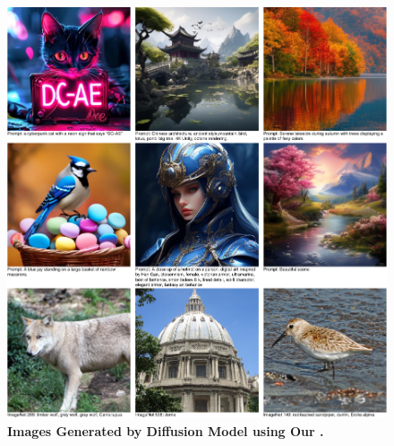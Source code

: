 \begin{figure}[t]
    \centering
    \includegraphics[width=1\linewidth]{figures/src/diffusion_visualization.pdf}
    \vspace{-15pt}
    \caption{\textbf{Images Generated by Diffusion Model using Our \modelshort.}}
    \vspace{-10pt}
    \label{fig:diffusion_visualization}
\end{figure}
